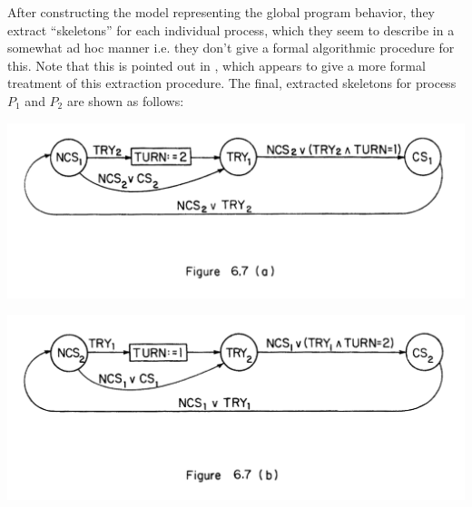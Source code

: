 \documentclass[10pt,a4paper]{article}
\begin{document}
After constructing the model representing the global program behavior, they extract ``skeletons'' for each individual process, which they seem to describe in a somewhat ad hoc manner i.e. they don't give a formal algorithmic procedure for this. Note that this is pointed out in \cite{2001attie}, which appears to give a more formal treatment of this extraction procedure. The final, extracted skeletons for process $P_1$ and $P_2$ are shown as follows:
\begin{center}
    \includegraphics[scale=0.3]{images/mutex_p1.png}
\end{center}
\begin{center}
    \includegraphics[scale=0.3]{images/mutex_p2.png}
\end{center}

% 
 

\end{document}
